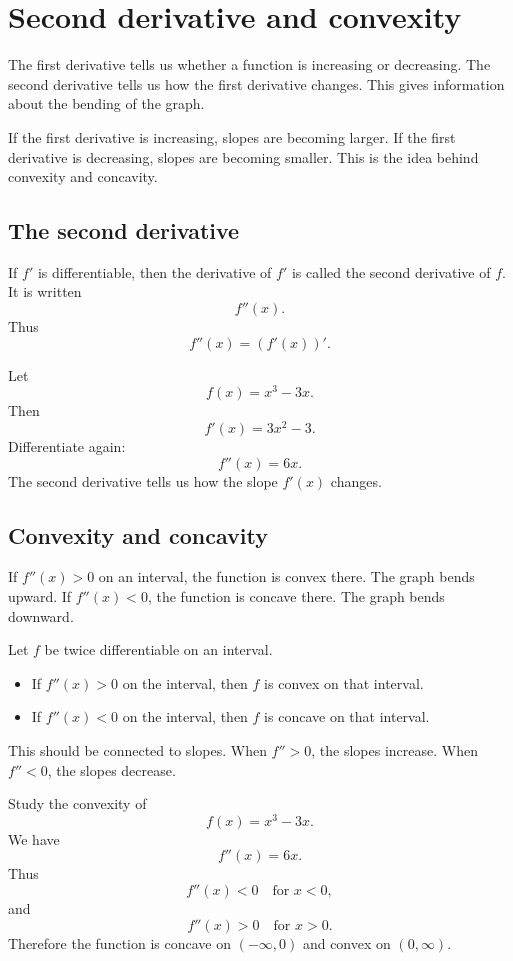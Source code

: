 \section{Second derivative and convexity}

The first derivative tells us whether a function is increasing or decreasing. The second derivative tells us how the first derivative changes. This gives information about the bending of the graph.

If the first derivative is increasing, slopes are becoming larger. If the first derivative is decreasing, slopes are becoming smaller. This is the idea behind convexity and concavity.

\subsection*{The second derivative}

If \(f'\) is differentiable, then the derivative of \(f'\) is called the second derivative of \(f\). It is written
\[
f''(x).
\]
Thus
\[
f''(x)=(f'(x))'.
\]

\begin{examplebox}
Let
\[
f(x)=x^3-3x.
\]
Then
\[
f'(x)=3x^2-3.
\]
Differentiate again:
\[
f''(x)=6x.
\]
The second derivative tells us how the slope \(f'(x)\) changes.
\end{examplebox}

\subsection*{Convexity and concavity}

If \(f''(x)>0\) on an interval, the function is convex there. The graph bends upward. If \(f''(x)<0\), the function is concave there. The graph bends downward.

\begin{theorembox}
Let \(f\) be twice differentiable on an interval.
\begin{itemize}
\item If \(f''(x)>0\) on the interval, then \(f\) is convex on that interval.
\item If \(f''(x)<0\) on the interval, then \(f\) is concave on that interval.
\end{itemize}
\end{theorembox}

This should be connected to slopes. When \(f''>0\), the slopes increase. When \(f''<0\), the slopes decrease.

\begin{examplebox}
Study the convexity of
\[
f(x)=x^3-3x.
\]
We have
\[
f''(x)=6x.
\]
Thus
\[
f''(x)<0 \quad\text{for } x<0,
\]
and
\[
f''(x)>0 \quad\text{for } x>0.
\]
Therefore the function is concave on \((-\infty,0)\) and convex on \((0,\infty)\).
\end{examplebox}

